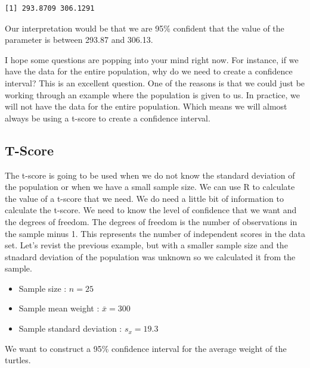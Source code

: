 \documentclass[
  letterpaper,
  DIV=11,
  numbers=noendperiod]{scrreprt}
\providecommand{\tightlist}{%
  \setlength{\itemsep}{0pt}\setlength{\parskip}{0pt}}\usepackage{longtable,booktabs,array}
\begin{document}
\begin{verbatim}
[1] 293.8709 306.1291
\end{verbatim}

Our interpretation would be that we are 95\% confident that the value of
the parameter is between 293.87 and 306.13.

I hope some questions are popping into your mind right now. For
instance, if we have the data for the entire population, why do we need
to create a confidence interval? This is an excellent question. One of
the reasons is that we could just be working through an example where
the population is given to us. In practice, we will not have the data
for the entire population. Which means we will almost always be using a
t-score to create a confidence interval.

\subsection*{T-Score}\label{t-score}

The t-score is going to be used when we do not know the standard
deviation of the population or when we have a small sample size. We can
use R to calculate the value of a t-score that we need. We do need a
little bit of information to calculate the t-score. We need to know the
level of confidence that we want and the degrees of freedom. The degrees
of freedom is the number of observations in the sample minus 1. This
represents the number of independent scores in the data set. Let's
revist the previous example, but with a smaller sample size and the
stnadard deviation of the population was unknown so we calculated it
from the sample.

\begin{itemize}
\tightlist
\item
  Sample size : \(n=25\)
\item
  Sample mean weight : \(\bar{x} = 300\)
\item
  Sample standard deviation : \(s_x = 19.3\)
\end{itemize}

We want to construct a 95\% confidence interval for the average weight
of the turtles.
\end{document}
